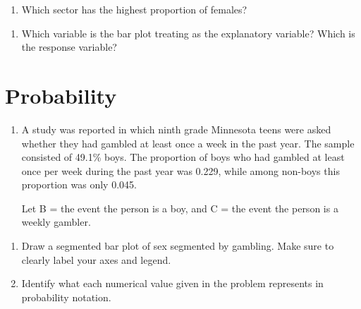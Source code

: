 \documentclass[
]{report}
\providecommand{\tightlist}{%
  \setlength{\itemsep}{0pt}\setlength{\parskip}{0pt}}
\begin{document}
\vspace{0.5in}

\begin{enumerate}
\def\labelenumi{\arabic{enumi}.}
\setcounter{enumi}{6}
\tightlist
\item
  Which sector has the highest proportion of females?
\end{enumerate}

\vspace{0.5in}

\begin{enumerate}
\def\labelenumi{\arabic{enumi}.}
\setcounter{enumi}{7}
\tightlist
\item
  Which variable is the bar plot treating as the explanatory variable? Which is the response variable?
\end{enumerate}

\newpage

\hypertarget{probability}{%
\section{Probability}\label{probability}}

\begin{enumerate}
\def\labelenumi{\arabic{enumi}.}
\setcounter{enumi}{8}
\item
  A study was reported in which ninth grade Minnesota teens were asked whether they had gambled at least once a week in the past year. The sample consisted of 49.1\% boys. The proportion of boys who had gambled at least once per week during the past year was 0.229, while among non-boys this proportion was only 0.045.
  \vspace{1mm}

  Let B = the event the person is a boy, and C = the event the person is a weekly gambler.
  \vspace{0.1in}
\end{enumerate}

\begin{enumerate}
\def\labelenumi{\alph{enumi}.}
\item
  Draw a segmented bar plot of sex segmented by gambling. Make sure to clearly label your axes and legend.
  \vspace{1.8in}
\item
  Identify what each numerical value given in the problem represents in probability notation.
  \vspace{.1in}
\end{enumerate}
\end{document}
